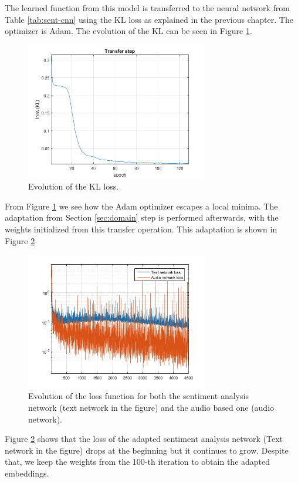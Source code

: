 The learned function from this model is transferred to the neural network from Table \ref{tab:sent-cnn} using the KL loss as explained in the previous chapter. The optimizer is Adam. The evolution of the KL can be seen in Figure \ref{fig:transfer}.

\begin{figure}[h]
    \centering
    \includegraphics[width=8cm]{figures/transfer}
    \caption{Evolution of the KL loss.}
    \label{fig:transfer}
\end{figure}

From Figure \ref{fig:transfer} we see how the Adam optimizer escapes a local minima. The adaptation from Section \ref{sec:domain} step is performed afterwards, with the weights initialized from this transfer operation. This adaptation is shown in Figure \ref{fig:adap-ev}

\begin{figure}[h]
    \centering
    \includegraphics[width=8cm]{figures/adapt}
    \caption{Evolution of the loss function for both the sentiment analysis network (text network in the figure) and the audio based one (audio network).}
    \label{fig:adap-ev}
\end{figure}

Figure \ref{fig:adap-ev} shows that the loss of the adapted sentiment analysis network (Text network in the figure) drops at the beginning but it continues to grow. Despite that, we keep the weights from the 100-th iteration to obtain the adapted embeddings.

